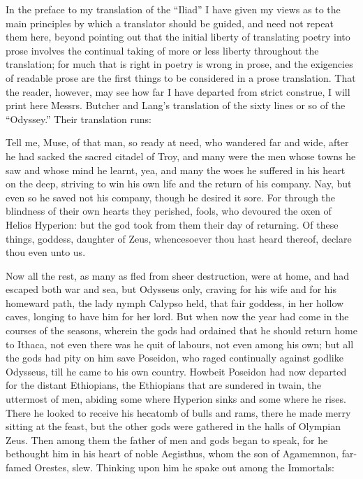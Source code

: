 In the preface to my translation of the “Iliad” I have given my views as to the
main principles by which a translator should be guided, and need not repeat
them here, beyond pointing out that the initial liberty of translating poetry
into prose involves the continual taking of more or less liberty throughout the
translation; for much that is right in poetry is wrong in prose, and the
exigencies of readable prose are the first things to be considered in a prose
translation. That the reader, however, may see how far I have departed from
strict construe, I will print here Messrs. Butcher and Lang’s translation of
the sixty lines or so of the “Odyssey.” Their translation runs:

Tell me, Muse, of that man, so ready at need, who wandered far and wide, after
he had sacked the sacred citadel of Troy, and many were the men whose towns he
saw and whose mind he learnt, yea, and many the woes he suffered in his heart
on the deep, striving to win his own life and the return of his company. Nay,
but even so he saved not his company, though he desired it sore. For through
the blindness of their own hearts they perished, fools, who devoured the oxen
of Helios Hyperion: but the god took from them their day of returning. Of these
things, goddess, daughter of Zeus, whencesoever thou hast heard thereof,
declare thou even unto us.

Now all the rest, as many as fled from sheer destruction, were at home, and
had escaped both war and sea, but Odysseus only, craving for his wife and for
his homeward path, the lady nymph Calypso held, that fair goddess, in her
hollow caves, longing to have him for her lord. But when now the year had come
in the courses of the seasons, wherein the gods had ordained that he should
return home to Ithaca, not even there was he quit of labours, not even among
his own; but all the gods had pity on him save Poseidon, who raged continually
against godlike Odysseus, till he came to his own country. Howbeit Poseidon had
now departed for the distant Ethiopians, the Ethiopians that are sundered in
twain, the uttermost of men, abiding some where Hyperion sinks and some where
he rises. There he looked to receive his hecatomb of bulls and rams, there he
made merry sitting at the feast, but the other gods were gathered in the halls
of Olympian Zeus. Then among them the father of men and gods began to speak,
for he bethought him in his heart of noble Aegisthus, whom the son of
Agamemnon, far-famed Orestes, slew. Thinking upon him he spake out among the
Immortals:

